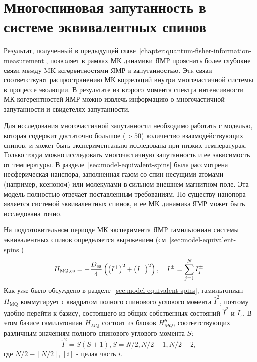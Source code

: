 \chapter{Многоспиновая запутанность в системе эквивалентных спинов}
\label{chapter:manyparticle-entanglement-in-nanopore}
%



Результат, полученный в предыдущей главе~\ref{chapter:quantum-fisher-information-measurement},
позволяет в рамках МК динамики ЯМР прояснить более глубокие связи между MK когерентностями ЯМР и запутанностью.
Эти связи соответствуют распространению МК корреляций внутри многочастичной системы в процессе эволюции.
В результате из второго момента спектра интенсивности МК когерентностей ЯМР
можно извлечь информацию о многочастичной запутанности и свидетелях запутанности.

Для исследования многочастичной запутанности необходимо работать с моделью,
которая содержит достаточно большое ($>50$) количество взаимодействующих спинов,
и может быть экспериментально исследована при низких температурах.
Только тогда можно исследовать многочастичную запутанность и ее зависимость от температуры.
В разделе~\ref{sec:model-equivalent-spins} была рассмотрена несферическая нанопора,
заполненная газом со спин-несущими атомами (например, ксеноном) или молекулами в сильном внешнем магнитном поле.
Эта модель полностью отвечает поставленным требованиям.
По существу нанопора является системой эквивалентных спинов,
и ее МК динамика ЯМР может быть исследована точно.

На подготовительном периоде МК эксперимента ЯМР гамильтониан системы эквивалентных спинов
определяется выражением (см~\ref{sec:model-equivalent-spins})
\begin{equation}\label{eq:mq-hamiltoninan-equivalent-spins}
  H_\mathrm{MQ,es} = - \frac{D_\mathrm{es}}{4} \left(  \left( I^+ \right)^2 + \left( I^- \right)^2  \right), \quad I^\pm = \sum\limits_{j=1}^{N} I^{\pm}_j
\end{equation}
%
\hmqEquivalentSpinsExplanatoryNote
Как уже было обсуждено в разделе~\ref{sec:model-equivalent-spins},
гамильтониан $H_\mathrm{MQ}$
коммутирует с квадратом полного спинового углового момента $\hat I^2$,
поэтому удобно перейти к базису,
состоящего из общих собственных состояний $\hat I^2$ и $I_z$.
В этом базисе гамильтониан $H_{MQ}$ состоит из блоков $H_{MQ}^S$, соответствующих различным значениям полного спинового углового момента $S$:
\begin{equation}
  \hat I^2 = S(S+1), S = N/2, N/2-1, N/2-2,
\end{equation}
где
$N/2 - [N/2]$, $[i]$ - целая часть $i$.

